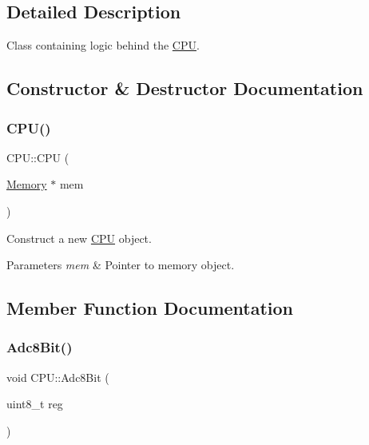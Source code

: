 \subsection{Detailed Description}
Class containing logic behind the \mbox{\hyperlink{classCPU}{C\+PU}}. 

\subsection{Constructor \& Destructor Documentation}
\mbox{\label{classCPU_a398bb4352a0dbaa9b2010f2084d9f8f7}} 
\subsubsection{\texorpdfstring{C\+P\+U()}{CPU()}}
{\footnotesize\ttfamily C\+P\+U\+::\+C\+PU (\begin{DoxyParamCaption}\item[{\mbox{\hyperlink{classMemory}{Memory}} $\ast$}]{mem }\end{DoxyParamCaption})}



Construct a new \mbox{\hyperlink{classCPU}{C\+PU}} object. 


\begin{DoxyParams}{Parameters}
{\em mem} & Pointer to memory object. \\
\hline
\end{DoxyParams}


\subsection{Member Function Documentation}
\mbox{\label{classCPU_a1ce2b87612cd02f3de675029d5ce436a}} 
\subsubsection{\texorpdfstring{Adc8\+Bit()}{Adc8Bit()}}
{\footnotesize\ttfamily void C\+P\+U\+::\+Adc8\+Bit (\begin{DoxyParamCaption}\item[{uint8\+\_\+t}]{reg }\end{DoxyParamCaption})\hspace{0.3cm}{\ttfamily [private]}}



